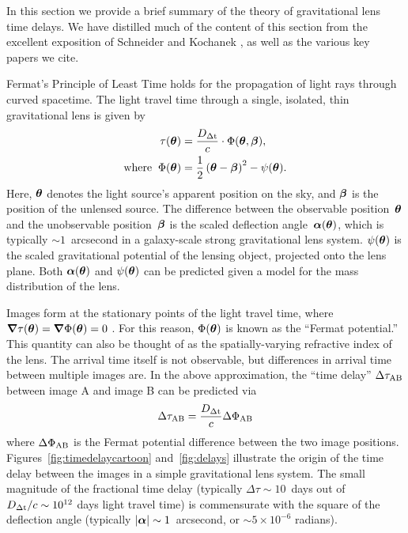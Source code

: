 
In this section we provide a brief summary of the theory of
gravitational lens time delays. We have distilled much of the content
of this section from the excellent exposition of Schneider and
Kochanek \citep{SKW06}, as well as the various key papers we cite.


Fermat's Principle of Least Time holds for the propagation of light rays
through curved spacetime. The light travel time through a single, isolated, thin
gravitational lens is given by
%
\begin{align}
    \tau(\boldsymbol{\theta}) &= \frac{D_{\Delta{\rm t}}}{c} \cdot \Phi(\boldsymbol{\theta},\boldsymbol{\beta}), \\
    \text{where\;\;} \Phi(\boldsymbol{\theta}) &= \frac{1}{2}\left(\boldsymbol{\theta} - \boldsymbol{\beta}\right)^2 - \psi(\boldsymbol{\theta}).
\end{align}
%
Here, $\boldsymbol{\theta}$ denotes the light source's apparent position on the sky, and
$\boldsymbol{\beta}$ is the position of the unlensed source. The difference between the
observable position~$\boldsymbol{\theta}$ and the unobservable position~$\boldsymbol{\beta}$ is the
scaled deflection angle~$\boldsymbol{\alpha}({\boldsymbol{\theta}})$, which is typically
$\sim1$~arcsecond in a galaxy-scale strong gravitational lens system.
$\psi(\boldsymbol{\theta})$ is the scaled gravitational potential of the lensing object,
projected onto the lens plane. Both $\boldsymbol{\alpha}(\boldsymbol{\theta})$ and $\psi(\boldsymbol{\theta})$ can be
predicted given a model for the mass distribution of the lens.

Images form at the stationary points of the light travel time, where $\boldsymbol{\nabla}
\tau(\boldsymbol{\theta}) = \boldsymbol{\nabla} \Phi(\boldsymbol{\theta}) = 0$ \citep{Schneider1985}. For this reason,
$\Phi(\boldsymbol{\theta})$ is known as the ``Fermat potential.'' This quantity can also
be thought of as the spatially-varying refractive index of the lens. The
arrival time itself is not observable, but differences in arrival time
between multiple images are. In the above approximation, the  ``time delay'' $\Delta \tau_{\rm AB}$
between image A and
image B can be predicted via
%
\begin{equation}
    \Delta \tau_{\rm AB} = \frac{D_{\Delta{\rm t}}}{c} \Delta \Phi_{\rm AB} \label{eq:timedelay}
\end{equation}
%
where $\Delta \Phi_{\rm AB}$ is the Fermat potential difference between the
two image positions.
Figures~\ref{fig:timedelaycartoon} and~\ref{fig:delays} illustrate the origin of the
time delay between the images in a simple gravitational lens system. The small
magnitude of the fractional time delay (typically $\Delta\tau \sim 10$~days out of
$D_{\Delta{\rm t}}/c \sim 10^{12}$ days light travel time)
is commensurate with the square of the
deflection angle (typically $|\boldsymbol{\alpha}|\sim1$~arcsecond, or $\sim 5\times10^{-6}$
radians).

